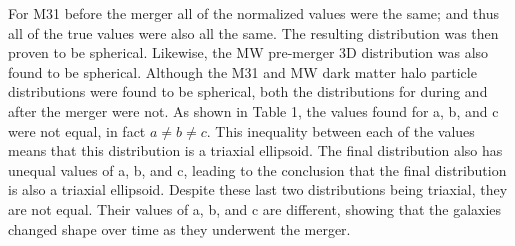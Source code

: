 \documentclass{aastex63}
\begin{document}
For M31 before the merger all of the normalized values were the same; and thus all of the true values were also all the same. The resulting distribution was then proven to be spherical. Likewise, the MW pre-merger 3D distribution was also found to be spherical. Although the M31 and MW dark matter halo particle distributions were found to be spherical, both the distributions for during and after the merger were not. As shown in Table 1, the values found for a, b, and c were not equal, in fact $a\neq b \neq c$. This inequality between each of the values means that this distribution is a triaxial ellipsoid. The final distribution also has unequal values of a, b, and c, leading to the conclusion that the final distribution is also a triaxial ellipsoid. Despite these last two distributions being triaxial, they are not equal. Their values of a, b, and c are different, showing that the galaxies changed shape over time as they underwent the merger. 
\end{document}
